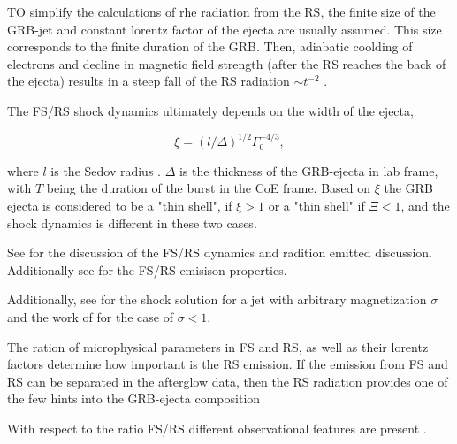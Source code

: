 TO simplify the calculations of rhe radiation from the RS, the finite size of the GRB-jet and constant lorentz factor of the ejecta are usually assumed. This size corresponds to the finite duration of the GRB.
Then, adiabatic coolding of electrons and decline in magnetic field strength (after the RS reaches the back of the ejecta) results in a steep fall of the RS radiation $\sim t^{-2}$ \citep{Sari:1999b}. 

The \ac{FS}/\ac{RS} shock dynamics ultimately depends on the width of the ejecta, \citep{Sari:1995}

\begin{equation}
\xi = (l/\Delta)^{1/2}\Gamma_0^{-4/3},
\end{equation}

where $l$ is the Sedov radius . 
$\Delta$ is the thickness of the \ac{GRB}-ejecta in lab frame, with $T$ being the duration of the burst in the \ac{CoE} frame. 
Based on $\xi$ the \ac{GRB} ejecta is considered to be a "thin shell", if $\xi > 1$ or a "thin shell" if $\Xi < 1$, and the shock dynamics is different in these two cases.

See \citet{Kobayashi:2000af} for the discussion of the \ac{FS}/\ac{RS} dynamics and radition emitted discussion.
Additionally see \citet{Kobayashi:2003zk,Kobayashi:2002uw,Zhang:2003wj,Kumar:2003fy,Wu:2003,Gao:2013mia} for the \ac{FS}/\ac{RS} emisison properties.

Additionally, see \citet{Zhang:2004ie,Mimica:2008up,Narayan:2011} for the shock solution for a jet with arbitrary magnetization $\sigma$ and the work of \citet{Fan et al. (2004)} for the case of $\sigma < 1$. 

The ration of microphysical parameters in FS and RS, as well as their lorentz factors determine how important is the RS emission. 
\citep{(Kobayashi and Zhang, 2003b; Zhang et al., 2003a; Nakar and Piran, 2004)}
If the emission from FS and RS can be separated in the afterglow data, then the RS radiation provides one of the few hints into the GRB-ejecta composition 
\citep{McMahon et al. (2006); Nakar and Piran (2004)}

With respect to the ratio FS/RS different observational features are present \citep{(Zhang et al., 2003a; Jin and Fan, 2007)}.

